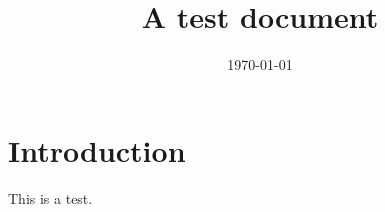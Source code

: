 \documentclass{article}
\title{A test document}
\date{\today}
\begin{document}
\maketitle

\section{Introduction}

This is a test. \citet{knittel2018working}



\end{document}
